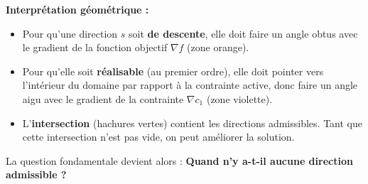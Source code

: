 \begin{figureexplanation}
\textbf{Interprétation géométrique :}
\begin{itemize}
    \item Pour qu'une direction $s$ soit \textbf{de descente}, elle doit faire un angle obtus avec le gradient de la fonction objectif $\nabla f$ (zone orange).
    \item Pour qu'elle soit \textbf{réalisable} (au premier ordre), elle doit pointer vers l'intérieur du domaine par rapport à la contrainte active, donc faire un angle aigu avec le gradient de la contrainte $\nabla c_1$ (zone violette).
    \item L'\textbf{intersection} (hachures vertes) contient les directions admissibles. Tant que cette intersection n'est pas vide, on peut améliorer la solution.
\end{itemize}
\end{figureexplanation}

La question fondamentale devient alors : \textbf{Quand n'y a-t-il aucune direction admissible ?}

